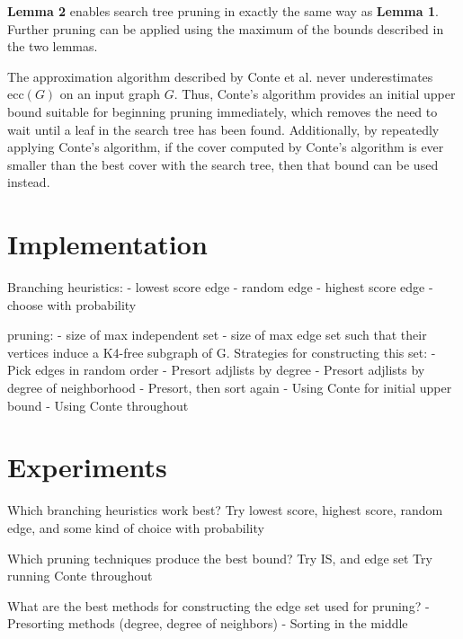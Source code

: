 \documentclass[12pt]{article}
\begin{document}
    \textbf{Lemma 2} enables search tree pruning in exactly the same way as \textbf{Lemma 1}.
    Further pruning can be applied using the maximum of the bounds described in the two lemmas.
    
    The approximation algorithm described by Conte et al. never underestimates $\text{ecc}(G)$ on an input graph $G$.
    Thus, Conte's algorithm provides an initial upper bound suitable for beginning pruning immediately, which removes the need to wait until a leaf in the search tree has been found.
    Additionally, by repeatedly applying Conte's algorithm, if the cover computed by Conte's algorithm is ever smaller than the best cover with the search tree, then that bound can be used instead.

\newpage\section*{Implementation}

    Branching heuristics:
        - lowest score edge
        - random edge
        - highest score edge
        - choose with probability

    pruning:
        - size of max independent set
        - size of max edge set such that their vertices induce a K4-free subgraph of G.
            Strategies for constructing this set:
                - Pick edges in random order
                - Presort adjlists by degree
                - Presort adjlists by degree of neighborhood
                - Presort, then sort again
        - Using Conte for initial upper bound
        - Using Conte throughout

\section*{Experiments}

    Which branching heuristics work best?
        Try lowest score, highest score, random edge, and some kind of choice with probability

    Which pruning techniques produce the best bound?
        Try IS, and edge set
        Try running Conte throughout

    What are the best methods for constructing the edge set used for pruning?
        - Presorting methods (degree, degree of neighbors)
        - Sorting in the middle
    
\end{document}
